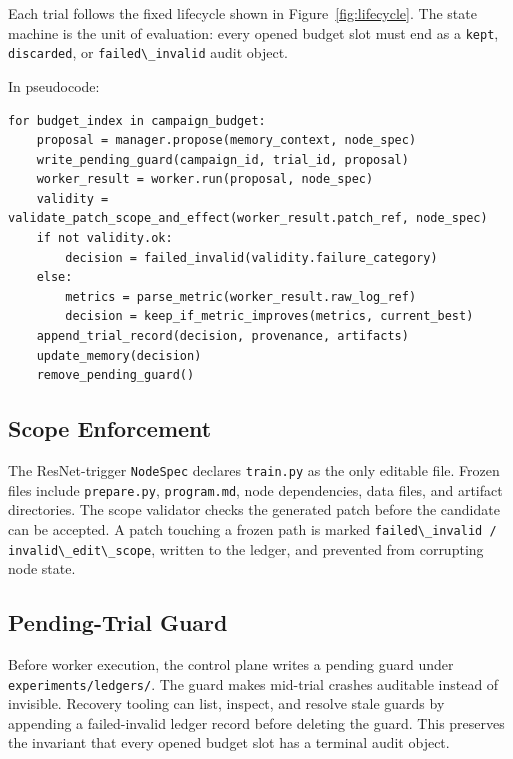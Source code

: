 Each trial follows the fixed lifecycle shown in Figure~\ref{fig:lifecycle}. The state machine is the unit of evaluation: every opened budget slot must end as a \passthrough{\lstinline!kept!}, \passthrough{\lstinline!discarded!}, or \passthrough{\lstinline!failed\_invalid!} audit object.



In pseudocode:

\begin{lstlisting}
for budget_index in campaign_budget:
    proposal = manager.propose(memory_context, node_spec)
    write_pending_guard(campaign_id, trial_id, proposal)
    worker_result = worker.run(proposal, node_spec)
    validity = validate_patch_scope_and_effect(worker_result.patch_ref, node_spec)
    if not validity.ok:
        decision = failed_invalid(validity.failure_category)
    else:
        metrics = parse_metric(worker_result.raw_log_ref)
        decision = keep_if_metric_improves(metrics, current_best)
    append_trial_record(decision, provenance, artifacts)
    update_memory(decision)
    remove_pending_guard()
\end{lstlisting}

\subsection{Scope Enforcement}\label{scope-enforcement}

The ResNet-trigger \passthrough{\lstinline!NodeSpec!} declares \passthrough{\lstinline!train.py!} as the only editable file. Frozen files include \passthrough{\lstinline!prepare.py!}, \passthrough{\lstinline!program.md!}, node dependencies, data files, and artifact directories. The scope validator checks the generated patch before the candidate can be accepted. A patch touching a frozen path is marked \passthrough{\lstinline!failed\_invalid / invalid\_edit\_scope!}, written to the ledger, and prevented from corrupting node state.

\subsection{Pending-Trial Guard}\label{pending-trial-guard}

Before worker execution, the control plane writes a pending guard under \passthrough{\lstinline!experiments/ledgers/!}. The guard makes mid-trial crashes auditable instead of invisible. Recovery tooling can list, inspect, and resolve stale guards by appending a failed-invalid ledger record before deleting the guard. This preserves the invariant that every opened budget slot has a terminal audit object.

